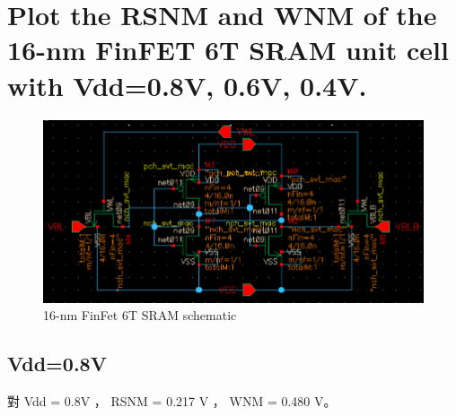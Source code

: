 \documentclass{article}
\begin{document}
\section{Plot the RSNM and WNM of the 16-nm FinFET 6T SRAM unit cell with Vdd=0.8V, 0.6V, 0.4V.}

\begin{figure}[H]
  \centering
  \includegraphics[width=0.9\linewidth]{./img/2024-01-11-10-29-38.png}
  \caption{16-nm FinFet 6T SRAM schematic}
  \end{figure}

\subsection{Vdd=0.8V}

對 Vdd = 0.8V ， RSNM = 0.217 V ， WNM = 0.480 V。
\end{document}
